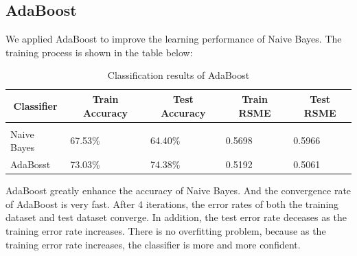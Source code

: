 \documentclass{article} %
\begin{document}
\subsection{AdaBoost}
We applied AdaBoost to improve the learning  performance of Naive Bayes. The training process is shown in the table below:

\begin{table}[h]
\caption{Classification results of AdaBoost}
\label{sample-table}
\begin{center}
\begin{tabular}{lllll}
\multicolumn{1}{c}{\bf Classifier}  &\multicolumn{1}{c}{\bf Train Accuracy} &\multicolumn{1}{c}{\bf Test Accuracy} &\multicolumn{1}{c}{\bf Train RSME} &\multicolumn{1}{c}{\bf Test RSME}
\\ \hline \\
Naive Bayes		&67.53\%   &64.40\%   &0.5698   &0.5966\\
AdaBosst	&73.03\%   &74.38\%   &0.5192   &0.5061\\
\end{tabular}
\end{center}
\end{table}

AdaBoost greatly enhance the accuracy of Naive Bayes.  And the convergence rate of AdaBoost is very fast. After 4 iterations, the error rates of both the training dataset and test dataset converge. In addition, the test error rate deceases as the training error rate increases. There is no overfitting problem, because as the training error rate increases, the classifier is more and more confident.
\end{document}
